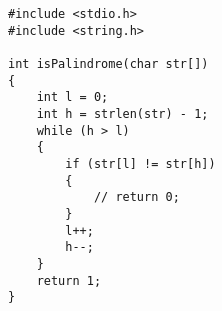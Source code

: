 
\begin{lstlisting}[style=CStyle, caption=Mutant M1 of function isPalindrome., label=isPalindrome_m1]
#include <stdio.h> 
#include <string.h> 

int isPalindrome(char str[]) 
{ 
    int l = 0; 
    int h = strlen(str) - 1; 
    while (h > l) 
    { 
        if (str[l] != str[h]) 
        { 
            // return 0;
        } 
        l++;
        h--;
    } 
    return 1; 
} 
\end{lstlisting}